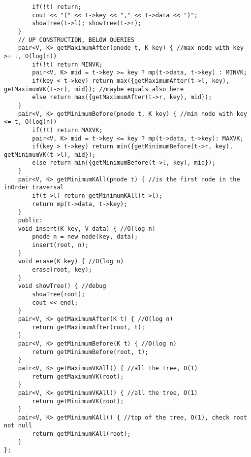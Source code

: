 \documentclass[a4paper,10pt]{article}
\begin{document}
\begin{multicols}{2}
\begin{verbatim}
        if(!t) return;
        cout << "(" << t->key << "," << t->data << ")";
        showTree(t->l); showTree(t->r);
    }
    // UP CONSTRUCTION, BELOW QUERIES
    pair<V, K> getMaximumAfter(pnode t, K key) { //max node with key >= t, O(log(n))
        if(!t) return MINVK;
        pair<V, K> mid = t->key >= key ? mp(t->data, t->key) : MINVK;
        if(key < t->key) return max({getMaximumAfter(t->l, key), getMaximumVK(t->r), mid}); //maybe equals also here
        else return max({getMaximumAfter(t->r, key), mid});
    }
    pair<V, K> getMinimumBefore(pnode t, K key) { //min node with key <= t, O(log(n))
        if(!t) return MAXVK;
        pair<V, K> mid = t->key <= key ? mp(t->data, t->key): MAXVK;
        if(key > t->key) return min({getMinimumBefore(t->r, key), getMinimumVK(t->l), mid});
        else return min({getMinimumBefore(t->l, key), mid});
    }
    pair<V, K> getMinimumKAll(pnode t) { //is the first node in the inOrder traversal
        if(t->l) return getMinimumKAll(t->l);
        return mp(t->data, t->key);
    }
    public:
    void insert(K key, V data) { //O(log n)
        pnode n = new node(key, data);
        insert(root, n);
    }
    void erase(K key) { //O(log n)
        erase(root, key);
    }
    void showTree() { //debug
        showTree(root);
        cout << endl;
    }
    pair<V, K> getMaximumAfter(K t) { //O(log n)
        return getMaximumAfter(root, t);
    }
    pair<V, K> getMinimumBefore(K t) { //O(log n)
        return getMinimumBefore(root, t);
    }
    pair<V, K> getMaximumVKAll() { //all the tree, O(1)
        return getMaximumVK(root);
    }
    pair<V, K> getMinimumVKAll() { //all the tree, O(1)
        return getMinimumVK(root);
    }
    pair<V, K> getMinimumKAll() { //top of the tree, O(1), check root not null
        return getMinimumKAll(root);
    }
};
\end{verbatim}
\end{multicols}
\end{document}
